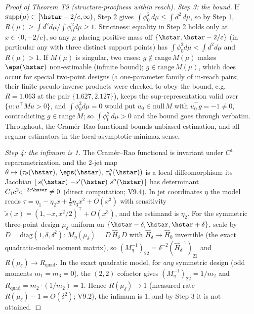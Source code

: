 \begin{proof}[Proof of Theorem T9 (structure-proofness within reach)]
\emph{Step 3: the bound.} If $\mathrm{supp}(\mu) \subset
[\hstar - 2/c, \infty)$, Step 2 gives $\int \phi_0^2\, d\mu \le \int
d^2\, d\mu$, so by Step 1, $R(\mu) \ge \int d^2 d\mu / \int \phi_0^2
d\mu \ge 1$. Strictness: equality in Step 2 holds only at
$x \in \{0, -2/c\}$, so any $\mu$ placing positive mass off
$\{\hstar, \hstar - 2/c\}$ (in particular any with three distinct
support points) has $\int \phi_0^2 d\mu < \int d^2 d\mu$ and
$R(\mu) > 1$. If $M(\mu)$ is singular, two cases:
$g \notin \mathrm{range}\,M(\mu)$ makes $\eps(\hstar)$ non-estimable
(infinite bound); $g \in \mathrm{range}\,M(\mu)$, which does occur for
special two-point designs (a one-parameter family of in-reach pairs;
their finite pseudo-inverse products were checked to obey the bound,
e.g.\ $R = 1.063$ at the pair $\{1.627, 2.127\}$), keeps
the sup-representation valid over $\{u : u^\top M u > 0\}$, and
$\int \phi_0^2 d\mu = 0$ would put $u_0 \in \mathrm{null}\, M$ with
$u_0^\top g = -1 \neq 0$, contradicting $g \in \mathrm{range}\,M$; so
$\int \phi_0^2\, d\mu > 0$ and the bound goes through verbatim.
Throughout, the Cram\'er--Rao functional bounds unbiased estimation,
and all regular estimators in the local-asymptotic-minimax sense.

\emph{Step 4: the infimum is 1.} The Cram\'er--Rao functional is
invariant under $C^1$ reparametrization, and the 2-jet map
$\theta \mapsto (\tau_\theta(\hstar),\, \eps(\hstar),\,
\tau_\theta''(\hstar))$ is a local diffeomorphism: its Jacobian
$[\,s(\hstar)\ {-s'(\hstar)}\ s''(\hstar)\,]$ has determinant
$C_1 c^2 e^{-2c\hstar} \neq 0$ (direct computation; V9.4). In jet
coordinates $\eta$ the model reads $\tau = \eta_1 - \eta_2 x +
\tfrac{1}{2}\eta_3 x^2 + O(x^3)$ with sensitivity $\tilde s(x) =
(1, -x, x^2/2)^\top + O(x^3)$, and the estimand is $\eta_2$. For the
symmetric three-point design $\mu_\delta$ uniform on $\{\hstar -
\delta, \hstar, \hstar + \delta\}$, scale by $D = \mathrm{diag}(1,
\delta, \delta^2)$: $M_\eta(\mu_\delta) = D\,\hat H_\delta\, D$ with
$\hat H_\delta \to \hat H_0$ invertible (the exact quadratic-model
moment matrix), so $(M_\eta^{-1})_{22} = \delta^{-2}(\hat
H_\delta^{-1})_{22}$ and $R(\mu_\delta) \to R_{\mathrm{quad}}$. In
the exact quadratic model, for \emph{any} symmetric design (odd
moments $m_1 = m_3 = 0$), the $(2,2)$ cofactor gives
$(M_\eta^{-1})_{22} = 1/m_2$ and $R_{\mathrm{quad}} = m_2 \cdot
(1/m_2) = 1$. Hence $R(\mu_\delta) \to 1$ (measured rate
$R(\mu_\delta) - 1 = O(\delta^2)$; V9.2), the infimum is 1, and by
Step 3 it is not attained.


\end{proof}

